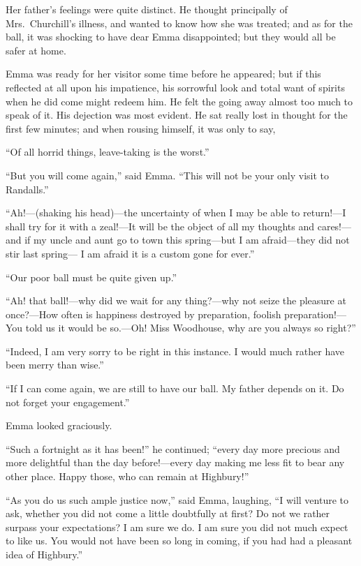 Her father's feelings were quite distinct.  He thought principally
of Mrs.\ Churchill's illness, and wanted to know how she was treated;
and as for the ball, it was shocking to have dear Emma disappointed;
but they would all be safer at home.

Emma was ready for her visitor some time before he appeared;
but if this reflected at all upon his impatience, his sorrowful
look and total want of spirits when he did come might redeem him.
He felt the going away almost too much to speak of it.  His dejection
was most evident.  He sat really lost in thought for the first
few minutes; and when rousing himself, it was only to say,

``Of all horrid things, leave-taking is the worst.''

``But you will come again,'' said Emma.  ``This will not be your only
visit to Randalls.''

``Ah!---(shaking his head)---the uncertainty of when I may be able
to return!---I shall try for it with a zeal!---It will be the object
of all my thoughts and cares!---and if my uncle and aunt go to town
this spring---but I am afraid---they did not stir last spring---%
I am afraid it is a custom gone for ever.''

``Our poor ball must be quite given up.''

``Ah! that ball!---why did we wait for any thing?---why not seize the
pleasure at once?---How often is happiness destroyed by preparation,
foolish preparation!---You told us it would be so.---Oh!  Miss Woodhouse,
why are you always so right?''

``Indeed, I am very sorry to be right in this instance.  I would
much rather have been merry than wise.''

``If I can come again, we are still to have our ball.  My father
depends on it.  Do not forget your engagement.''

Emma looked graciously.

``Such a fortnight as it has been!'' he continued; ``every day more
precious and more delightful than the day before!---every day making
me less fit to bear any other place.  Happy those, who can remain
at Highbury!''

``As you do us such ample justice now,'' said Emma, laughing, ``I will
venture to ask, whether you did not come a little doubtfully at first?
Do not we rather surpass your expectations?  I am sure we do.
I am sure you did not much expect to like us.  You would not have been
so long in coming, if you had had a pleasant idea of Highbury.''

